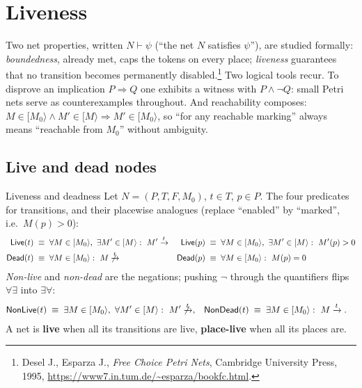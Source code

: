 \section{Liveness}

Two net properties, written $N \vdash \psi$ (``the net $N$ satisfies $\psi$''), are studied formally: \emph{boundedness}, already met, caps the tokens on every place; \emph{liveness} guarantees that no transition becomes permanently disabled.\footnote{Desel J., Esparza J., \emph{Free Choice Petri Nets}, Cambridge University Press, 1995, \url{https://www7.in.tum.de/~esparza/bookfc.html}.} Two logical tools recur. To disprove an implication $P \Rightarrow Q$ one exhibits a witness with $P \wedge \neg Q$: small Petri nets serve as counterexamples throughout. And reachability composes: $M \in [M_0\rangle \wedge M' \in [M\rangle \Rightarrow M' \in [M_0\rangle$, so ``for any reachable marking'' always means ``reachable from $M_0$'' without ambiguity.

\subsection{Live and dead nodes}

\begin{definitionbox}{Liveness and deadness}
Let $N = (P, T, F, M_0)$, $t \in T$, $p \in P$. The four predicates for transitions, and their placewise analogues (replace ``enabled'' by ``marked'', i.e.\ $M(p) > 0$):
\begin{align*}
  \mathsf{Live}(t) &\;\equiv\; \forall M \in [M_0\rangle,\ \exists M' \in [M\rangle :\ M' \xrightarrow{t}
  & \mathsf{Live}(p) &\;\equiv\; \forall M \in [M_0\rangle,\ \exists M' \in [M\rangle :\ M'(p) > 0 \\
  \mathsf{Dead}(t) &\;\equiv\; \forall M \in [M_0\rangle :\ M \not\xrightarrow{t}
  & \mathsf{Dead}(p) &\;\equiv\; \forall M \in [M_0\rangle :\ M(p) = 0
\end{align*}
\emph{Non-live} and \emph{non-dead} are the negations; pushing $\neg$ through the quantifiers flips $\forall\exists$ into $\exists\forall$:
\begin{align*}
  \mathsf{NonLive}(t) &\;\equiv\; \exists M \in [M_0\rangle,\ \forall M' \in [M\rangle :\ M' \not\xrightarrow{t},
  & \mathsf{NonDead}(t) &\;\equiv\; \exists M \in [M_0\rangle :\ M \xrightarrow{t}.
\end{align*}
A net is \textbf{live} when all its transitions are live, \textbf{place-live} when all its places are.
\end{definitionbox}

